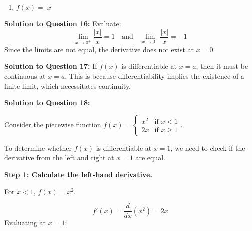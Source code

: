 \documentclass{article}
\begin{document}
\begin{enumerate}[itemsep=20pt]
    \item \( f(x) = |x| \)

\end{enumerate}


   



    \item \textbf{Solution to Question 16:}
    Evaluate:
    \[
    \lim_{x \to 0^+} \frac{|x|}{x} = 1 \quad \text{and} \quad \lim_{x \to 0^-} \frac{|x|}{x} = -1
    \]
    Since the limits are not equal, the derivative does not exist at \( x = 0 \).

    \item \textbf{Solution to Question 17:}
    If \( f(x) \) is differentiable at \( x = a \), then it must be continuous at \( x = a \). This is because differentiability implies the existence of a finite limit, which necessitates continuity.

    

    

    \item \textbf{Solution to Question 18:}

    Consider the piecewise function \( f(x) = 
    \begin{cases} 
    x^2 & \text{if } x < 1 \\
    2x & \text{if } x \geq 1 
    \end{cases} \).

    To determine whether \( f(x) \) is differentiable at \( x = 1 \), we need to check if the derivative from the left and right at \( x = 1 \) are equal.

    \textbf{Step 1: Calculate the left-hand derivative.}

    For \( x < 1 \), \( f(x) = x^2 \).

    \[
    f'(x) = \frac{d}{dx} (x^2) = 2x
    \]
    Evaluating at \( x = 1 \):
\end{document}
